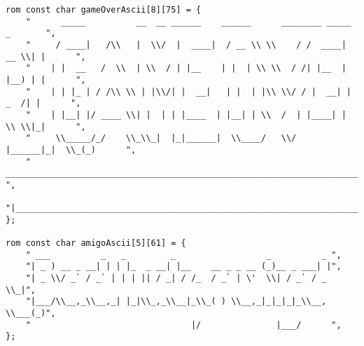 \begin{lstlisting}
rom const char gameOverAscii[8][75] = {
	"      _____          __  __ ______    ______      ________ _____  _       ",
	"     / ____|   /\\   |  \\/  |  ____|  / __ \\ \\    / /  ____|  __ \\| |      ",
	"    | |  __   /  \\  | \\  / | |__    | |  | \\ \\  / /| |__  | |__) | |      ",
	"    | | |_ | / /\\ \\ | |\\/| |  __|   | |  | |\\ \\/ / |  __| |  _  /| |      ",
	"    | |__| |/ ____ \\| |  | | |____  | |__| | \\  /  | |____| | \\ \\|_|      ",
	"     \\_____/_/    \\_\\_|  |_|______|  \\____/   \\/   |______|_|  \\_(_)      ",
	" ________________________________________________________________________ ",
	"|________________________________________________________________________|",
};

rom const char amigoAscii[5][61] = {
	" ___          _   _         _                  _          _ ",
	"| _ ) __ _ __| | | |_  _ __| |__    __ _ _ __ (_)__ _ ___| |",
	"| _ \\/ _` / _` | | | || / _| / /_  / _` | \'  \\| / _` / _ \\_|",
	"|___/\\__,_\\__,_| |_|\\_,_\\__|_\\_( ) \\__,_|_|_|_|_\\__, \\___(_)",
	"                                |/               |___/      ",
};


\end{lstlisting}
